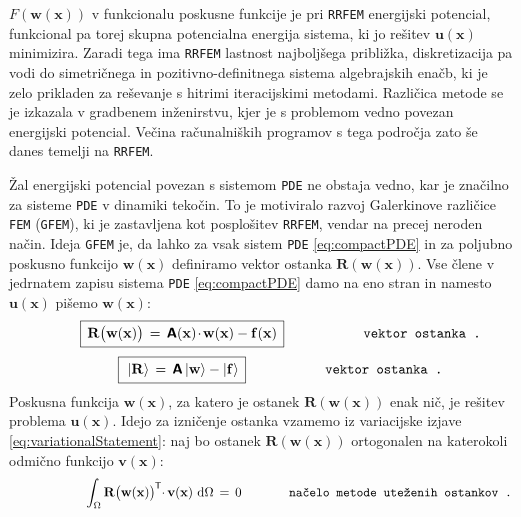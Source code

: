 $F\left(\mathbf{w}(\mathbf{x})\right)$ v funkcionalu poskusne funkcije je pri \texttt{RRFEM} energijski potencial, funkcional pa torej skupna potencialna energija sistema, ki jo rešitev $\mathbf{u}(\mathbf{x})$ minimizira. Zaradi tega ima \texttt{RRFEM} last\-nost najboljšega približka, diskretizacija pa vodi do simetričnega in pozitivno-definitnega sistema algebrajskih enačb, ki je zelo prikladen za reševanje s hitrimi iteracijskimi metodami. Različica metode se je izkazala v gradbenem inženirstvu, kjer je s problemom vedno povezan energijski potencial. Večina računalniških programov s tega področja zato še danes temelji na \texttt{RRFEM}.

Žal energijski potencial povezan s sistemom \texttt{PDE} ne obstaja vedno, kar je značilno za sisteme \texttt{PDE} v dinamiki tekočin. To je motiviralo razvoj Galerkinove različice \texttt{FEM} (\texttt{GFEM}), ki je zastavljena kot posplošitev \texttt{RRFEM}, vendar na precej neroden način. Ideja \texttt{GFEM} je, da lahko za vsak sistem \texttt{PDE} \eqref{eq:compactPDE} in za poljubno poskusno funkcijo $\mathbf{w(x)}$ definiramo vektor ostanka $\mathbf{R(w(x))}$. Vse člene v jedrnatem zapisu sistema \texttt{PDE} \eqref{eq:compactPDE} damo na eno stran in namesto $\mathbf{u(x)}$ pišemo $\mathbf{w(x)}$:
\begin{equation}
	\hspace{10mm} \boxed{\, \vphantom{\big(}
		\mathbf{R\big(w(x)\big)} \, = \, \mathbsf{A}(\mathbf{x}) \mkern-2.5mu \cdot \mkern-2mu \mathbf{w(x)} - \mathbf{f(x)} \,
	}\hspace{20mm} \texttt{vektor ostanka .}
	\label{eq:residual}
\end{equation}
\begin{equation}
	\hspace{10mm} \boxed{\, \vphantom{\big(}
		\ket{\mathbf{R}} \, = \, \mathbsf{A} \ket{\mathbf{w}} - \ket{\mathbf{f}} \,
	}\hspace{20mm} \texttt{vektor ostanka .}
	\label{eq:residual}
\end{equation}
Poskusna funkcija $\mathbf{w(x)}$, za katero je ostanek $\mathbf{R(w(x))}$ enak nič, je rešitev problema $\mathbf{u(x)}$. Idejo za izničenje ostanka vzamemo iz variacijske izjave \eqref{eq:variationalStatement}: naj bo ostanek $\mathbf{R(w(x))}$ ortogonalen na katerokoli odmično funkcijo $\mathbf{v(x)}$:
\begin{equation}
	\hspace{21mm} \int_{\Omega} \mathbf{R\big(w(x)\big)}^\mathsf{\mkern-1mu T} \mkern-4.5mu \cdot \mkern-1mu \mathbf{v(x)} \ \ud \Omega \, = \, 0 \hspace{13mm} \texttt{načelo metode uteženih ostankov .}
	\label{eq:GfemStatement}
\end{equation}
